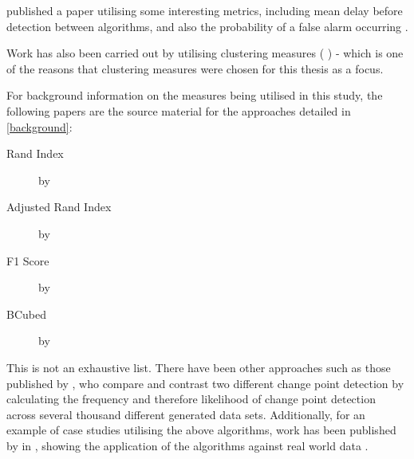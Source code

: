 \documentclass[../main.tex]{subfiles}
\begin{document}
\citeauthor{Downey2008} published a paper utilising some interesting metrics, including mean delay before detection between algorithms, and also the probability of a false alarm occurring \cite{Downey2008}.

Work has also been carried out by \citeauthor{Matteson2012} utilising clustering measures ( \cite{Matteson2012}) - which is one of the reasons that clustering measures were chosen for this thesis as a focus.

For background information on the measures being utilised in this study, the following papers are the source material for the approaches detailed in \autoref{background}:

\begin{description}
    \item[Rand Index]  by \citeauthor{Rand1971} \cite{Rand1971}
    \item[Adjusted Rand Index]  by \citeauthor{Hubert1985} \cite{Hubert1985}
    \item[F1 Score]  by \citeauthor{Kent1955} \cite{Kent1955}
    \item[BCubed]  by \citeauthor{Bagga1998} \cite{Bagga1998} 
\end{description}

This is not an exhaustive list. There have been other approaches such as those published by \citeauthor{Madrid2004} \cite{Madrid2004}, who compare and contrast two different change point detection by calculating the frequency and therefore likelihood of change point detection across several thousand different generated data sets. Additionally, for an example of case studies utilising the above algorithms, work has been published by \citeauthor{Killick2014} in , showing the application of the algorithms against real world data \cite{Killick2014}.
    
\end{document}
